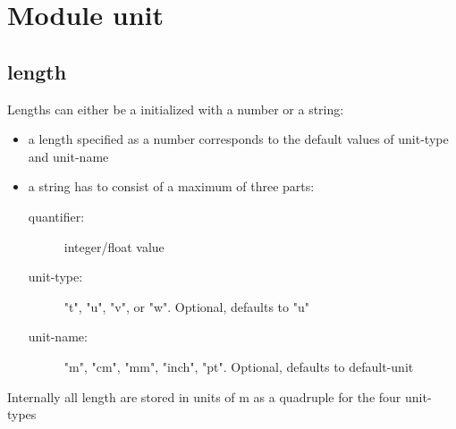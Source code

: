 \chapter{Module unit}
\label{unit}
\section{\PyX{} length}
Lengths can either be a initialized with a number or a string:
\begin{itemize}
\item a length specified as a number corresponds to the default values of
unit-type and unit-name
\item a string has to consist of a maximum of three parts:
\begin{description}
\item[quantifier:] integer/float value
\item[unit-type:] "t", "u", "v", or "w". Optional, defaults to "u"
\item[unit-name:] "m", "cm", "mm", "inch", "pt". Optional, defaults
to default-unit
\end{description}
\end{itemize}
Internally all length are stored in units of m as a quadruple for the
four unit-types
